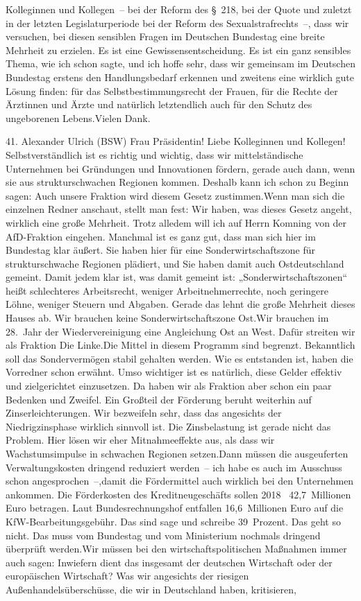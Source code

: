 \documentclass{article}
\begin{document}
Kolleginnen und Kollegen – bei der Reform des § 218, bei der Quote und zuletzt in der letzten Legislaturperiode bei der Reform des Sexualstrafrechts –, dass wir versuchen, bei diesen sensiblen Fragen im Deutschen Bundestag eine breite Mehrheit zu erzielen. Es ist eine Gewissensentscheidung. Es ist ein ganz sensibles Thema, wie ich schon sagte, und ich hoffe sehr, dass wir gemeinsam im Deutschen Bundestag erstens den Handlungsbedarf erkennen und zweitens eine wirklich gute Lösung finden: für das Selbstbestimmungsrecht der Frauen, für die Rechte der Ärztinnen und Ärzte und natürlich letztendlich auch für den Schutz des ungeborenen Lebens.Vielen Dank.




	41. Alexander Ulrich (BSW) Frau Präsidentin! Liebe Kolleginnen und Kollegen! Selbstverständlich ist es richtig und wichtig, dass wir mittelständische Unternehmen bei Gründungen und Innovationen fördern, gerade auch dann, wenn sie aus strukturschwachen Regionen kommen. Deshalb kann ich schon zu Beginn sagen: Auch unsere Fraktion wird diesem Gesetz zustimmen.Wenn man sich die einzelnen Redner anschaut, stellt man fest: Wir haben, was dieses Gesetz angeht, wirklich eine große Mehrheit. Trotz alledem will ich auf Herrn Komning von der AfD-Fraktion eingehen. Manchmal ist es ganz gut, dass man sich hier im Bundestag klar äußert. Sie haben hier für eine Sonderwirtschaftszone für strukturschwache Regionen plädiert, und Sie haben damit auch Ostdeutschland gemeint. Damit jedem klar ist, was damit gemeint ist: „Sonderwirtschaftszonen“ heißt schlechteres Arbeitsrecht, weniger Arbeitnehmerrechte, noch geringere Löhne, weniger Steuern und Abgaben. Gerade das lehnt die große Mehrheit dieses Hauses ab. Wir brauchen keine Sonderwirtschaftszone Ost.Wir brauchen im 28. Jahr der Wiedervereinigung eine Angleichung Ost an West. Dafür streiten wir als Fraktion Die Linke.Die Mittel in diesem Programm sind begrenzt. Bekanntlich soll das Sondervermögen stabil gehalten werden. Wie es entstanden ist, haben die Vorredner schon erwähnt. Umso wichtiger ist es natürlich, diese Gelder effektiv und zielgerichtet einzusetzen. Da haben wir als Fraktion aber schon ein paar Bedenken und Zweifel. Ein Großteil der Förderung beruht weiterhin auf Zinserleichterungen. Wir bezweifeln sehr, dass das angesichts der Niedrigzinsphase wirklich sinnvoll ist. Die Zinsbelastung ist gerade nicht das Problem. Hier lösen wir eher Mitnahmeeffekte aus, als dass wir Wachstumsimpulse in schwachen Regionen setzen.Dann müssen die ausgeuferten Verwaltungskosten dringend reduziert werden – ich habe es auch im Ausschuss schon angesprochen –,damit die Fördermittel auch wirklich bei den Unternehmen ankommen. Die Förderkosten des Kreditneugeschäfts sollen 2018  42,7 Millionen Euro betragen. Laut Bundesrechnungshof entfallen 16,6 Millionen Euro auf die KfW-Bearbeitungsgebühr. Das sind sage und schreibe 39 Prozent. Das geht so nicht. Das muss vom Bundestag und vom Ministerium nochmals dringend überprüft werden.Wir müssen bei den wirtschaftspolitischen Maßnahmen immer auch sagen: Inwiefern dient das insgesamt der deutschen Wirtschaft oder der europäischen Wirtschaft? Was wir angesichts der riesigen Außenhandelsüberschüsse, die wir in Deutschland haben, kritisieren, 
\end{document}
